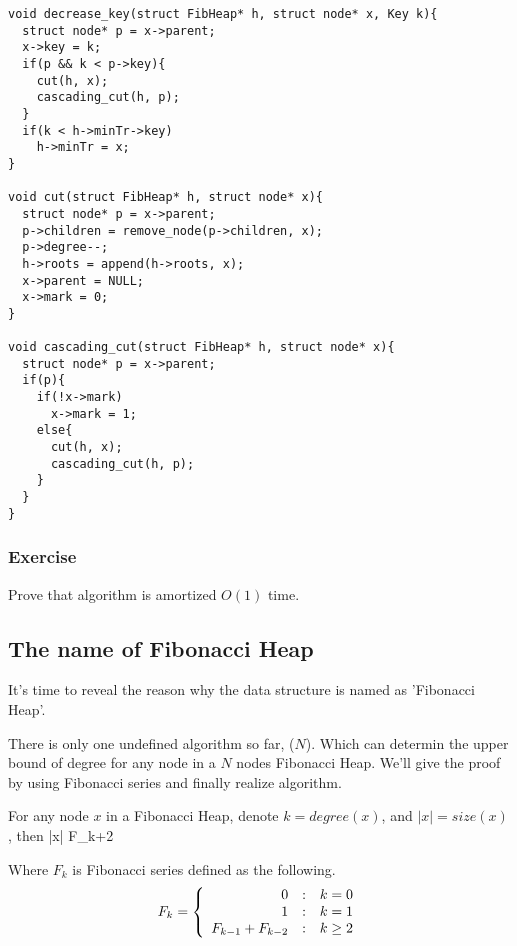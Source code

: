 \documentclass{article}
\begin{document}
\lstset{language=C}
\begin{lstlisting}
void decrease_key(struct FibHeap* h, struct node* x, Key k){
  struct node* p = x->parent;
  x->key = k;
  if(p && k < p->key){
    cut(h, x);
    cascading_cut(h, p);
  }
  if(k < h->minTr->key)
    h->minTr = x;
}

void cut(struct FibHeap* h, struct node* x){
  struct node* p = x->parent;
  p->children = remove_node(p->children, x);
  p->degree--;
  h->roots = append(h->roots, x);
  x->parent = NULL;
  x->mark = 0;
}

void cascading_cut(struct FibHeap* h, struct node* x){
  struct node* p = x->parent;
  if(p){
    if(!x->mark)
      x->mark = 1;
    else{
      cut(h, x);
      cascading_cut(h, p);
    }
  }
}
\end{lstlisting}

\subsubsection*{Exercise}
Prove that  algorithm is amortized $O(1)$ time.

\subsection{The name of Fibonacci Heap}
It's time to reveal the reason why the data structure is named
as 'Fibonacci Heap'.

There is only one undefined algorithm so far, ($N$).
Which can determin the upper bound of degree for any node in a $N$ nodes 
Fibonacci Heap. We'll give the proof by using Fibonacci series and
finally realize  algorithm.

\begin{lemma}
\label{lemma:Fib-degree}
For any node $x$ in a Fibonacci Heap, denote $k = degree(x)$, and
$|x| = size(x)$, then
\be
  |x| \geq F_{k+2}
\ee

Where $F_k$ is Fibonacci series defined as the following.
\[
F_k = \left \{
  \begin{array}
  {r@{\quad:\quad}l}
  0 & k = 0 \\
  1 & k = 1 \\
  F_{k-1} + F_{k-2} & k \geq 2 
  \end{array}
\right.
\]
\end{lemma}
\end{document}
